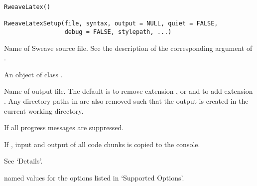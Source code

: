 %
\begin{Usage}
\begin{verbatim}
RweaveLatex()

RweaveLatexSetup(file, syntax, output = NULL, quiet = FALSE,
                 debug = FALSE, stylepath, ...)
\end{verbatim}
\end{Usage}
%
\begin{Arguments}
\begin{ldescription}
\item[\code{file}] Name of Sweave source file.  See the description of the
corresponding argument of .
\item[\code{syntax}] An object of class .
\item[\code{output}] Name of output file.  The default is to remove extension
,  or  and to add
extension .  Any directory paths in
 are also removed such that the output is
created in the current working directory.
\item[\code{quiet}] If  all progress messages are suppressed.
\item[\code{debug}] If , input and output of all code
chunks is copied to the console.
\item[\code{stylepath}] See `Details'.
\item[\code{...}] named values for the options listed in `Supported
Options'.
\end{ldescription}
\end{Arguments}
%
